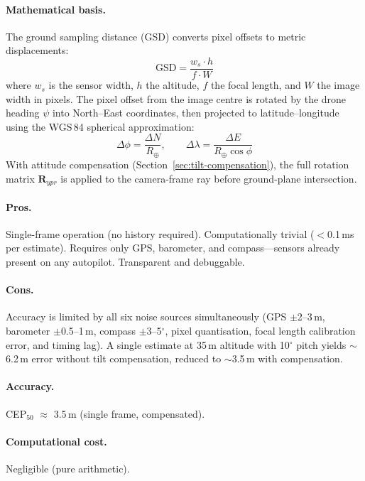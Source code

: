 \paragraph{Mathematical basis.}
The ground sampling distance (GSD) converts pixel offsets to metric displacements:
\begin{equation}
  \mathrm{GSD} = \frac{w_s \cdot h}{f \cdot W}
\end{equation}
where $w_s$ is the sensor width, $h$ the altitude, $f$ the focal length, and $W$ the image width in pixels.  The pixel offset from the image centre is rotated by the drone heading $\psi$ into North--East coordinates, then projected to latitude--longitude using the WGS\,84 spherical approximation:
\begin{equation}
  \Delta\phi = \frac{\Delta N}{R_\oplus}, \qquad
  \Delta\lambda = \frac{\Delta E}{R_\oplus \cos\phi}
\end{equation}
With attitude compensation (Section~\ref{sec:tilt-compensation}), the full rotation matrix $\mathbf{R}_{ypr}$ is applied to the camera-frame ray before ground-plane intersection.

\paragraph{Pros.}
Single-frame operation (no history required).  Computationally trivial ($<$0.1\,ms per estimate).  Requires only GPS, barometer, and compass---sensors already present on any autopilot.  Transparent and debuggable.

\paragraph{Cons.}
Accuracy is limited by all six noise sources simultaneously (GPS $\pm$2--3\,m, barometer $\pm$0.5--1\,m, compass $\pm$3--5$^\circ$, pixel quantisation, focal length calibration error, and timing lag).  A single estimate at 35\,m altitude with 10$^\circ$ pitch yields $\sim$6.2\,m error without tilt compensation, reduced to $\sim$3.5\,m with compensation.

\paragraph{Accuracy.}  CEP$_{50}$ $\approx$ 3.5\,m (single frame, compensated).

\paragraph{Computational cost.}  Negligible (pure arithmetic).

